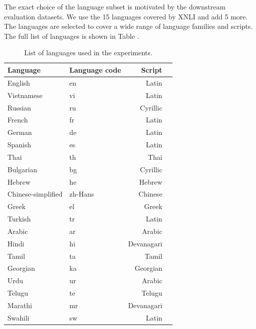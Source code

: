 The exact choice of the language subset is motivated by the downstream evaluation datasets. We use the 15 languages covered by XNLI and add 5 more. The languages are selected to cover a wide range of language families and scripts. The full list of languages is shown in Table .


\begin{table}
    \centering\footnotesize\sf
    \begin{tabular}{llrl}
    \toprule
    Language & Language code & Script \\
    \midrule
    English & en & Latin \\
    Vietnamese & vi & Latin \\
    Russian & ru & Cyrillic \\
    French & fr & Latin \\
    German & de & Latin \\
    Spanish & es & Latin \\
    Thai & th & Thai \\
    Bulgarian & bg & Cyrillic \\
    Hebrew & he & Hebrew \\
    Chinese-simplified & zh-Hans & Chinese \\
    Greek & el & Greek \\
    Turkish & tr & Latin \\
    Arabic & ar & Arabic \\
    Hindi & hi & Devanagari \\
    Tamil & ta & Tamil \\
    Georgian & ka & Georgian \\
    Urdu & ur & Arabic \\
    Telugu & te & Telugu \\
    Marathi & mr & Devanagari \\
    Swahili & sw & Latin \\
    \bottomrule
    \end{tabular}
    \caption{List of languages used in the experiments.}
    \label{tab:languages}
\end{table}
    

